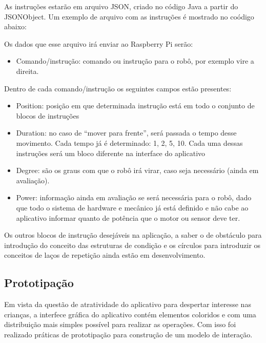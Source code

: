 As instruções estarão em arquivo JSON, criado no código Java a partir do JSONObject. Um exemplo de arquivo com as instruções é mostrado no coódigo abaixo:



Os dados que esse arquivo irá enviar ao Raspberry Pi serão:
\begin{itemize}
	\item Comando/instrução: comando ou instrução para o robô, por exemplo vire a direita.
\end{itemize}

Dentro de cada comando/instrução os seguintes campos estão presentes:
\begin{itemize}
\item Position: posição em que determinada instrução está em todo o conjunto de blocos de instruções
\item Duration: no caso de “mover para frente”, será passada o tempo desse movimento. Cada tempo já é determinado: 1, 2, 5, 10. Cada uma dessas instruções será um bloco diferente na interface do aplicativo
\item Degree: são os graus com que o robô irá virar, caso seja necessário (ainda em avaliação).
\item Power: informação ainda em avaliação se será necessária para o robô, dado que todo o sistema de hardware e mecânico já está definido e não cabe ao aplicativo informar quanto de potência que o motor ou sensor deve ter.
\end{itemize}

Os outros blocos de instrução desejáveis na aplicação, a saber o de obstáculo para introdução do conceito das estruturas de condição e os círculos para introduzir os conceitos de laços de repetição ainda estão em desenvolvimento.

\subsection{Prototipação}

Em vista da questão de atratividade do aplicativo para despertar interesse nas crianças, a interfece gráfica do aplicativo contém elementos
coloridos e com uma distribuição mais simples possível para realizar as operações. Com isso foi realizado práticas de prototipação para construção
de um modelo de interação.
